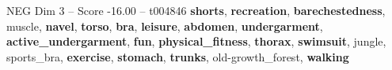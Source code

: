 \begin{textsample}{NEG Dim 3 – Score -16.00 – t004846}  \label{ex:f3_neg_022}
\textbf{shorts}, \textbf{recreation}, \textbf{barechestedness}, muscle, \textbf{navel}, \textbf{torso}, \textbf{bra}, \textbf{leisure}, \textbf{abdomen}, \textbf{undergarment}, \textbf{active\_undergarment}, \textbf{fun}, \textbf{physical\_fitness}, \textbf{thorax}, \textbf{swimsuit}, jungle, sports\_bra, \textbf{exercise}, \textbf{stomach}, \textbf{trunks}, old-growth\_forest, \textbf{walking}

\end{textsample}
